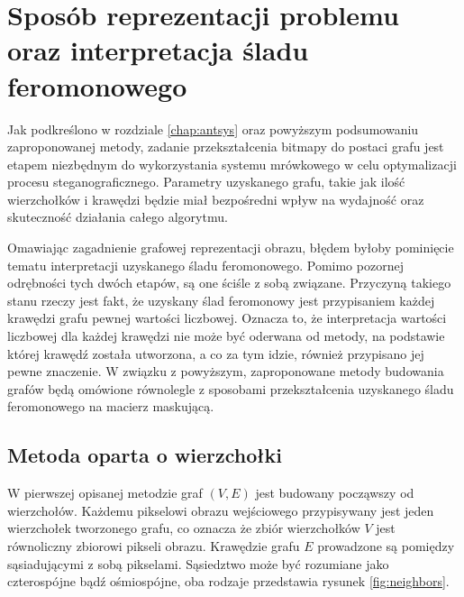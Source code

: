 {    \section{Sposób reprezentacji problemu oraz interpretacja śladu feromonowego}\label{sec:method}
    {
        Jak podkreślono w rozdziale \ref{chap:antsys} oraz powyższym podsumowaniu zaproponowanej metody, zadanie
        przekształcenia bitmapy do postaci grafu jest etapem niezbędnym do wykorzystania systemu mrówkowego w celu
        optymalizacji procesu steganograficznego. Parametry uzyskanego grafu, takie jak ilość wierzchołków i krawędzi
        będzie miał bezpośredni wpływ na wydajność oraz skuteczność działania całego algorytmu.

        Omawiając zagadnienie grafowej reprezentacji obrazu, błędem byłoby pominięcie tematu interpretacji uzyskanego
        śladu feromonowego. Pomimo pozornej odrębności tych dwóch etapów, są one ściśle z sobą związane. Przyczyną
        takiego stanu rzeczy jest fakt, że uzyskany ślad feromonowy jest przypisaniem każdej krawędzi grafu pewnej
        wartości liczbowej. Oznacza to, że interpretacja wartości liczbowej dla każdej krawędzi nie może być oderwana od
        metody, na podstawie której krawędź została utworzona, a co za tym idzie, również przypisano jej pewne
        znaczenie. W związku z powyższym, zaproponowane metody budowania grafów będą omówione równolegle z sposobami
        przekształcenia uzyskanego śladu feromonowego na macierz maskującą.

        \subsection{Metoda oparta o wierzchołki}\label{subsec:vertex-method}
        {
            W pierwszej opisanej metodzie graf $(V, E)$ jest budowany począwszy od wierzchołów. Każdemu pikselowi obrazu
            wejściowego przypisywany jest jeden wierzchołek tworzonego grafu, co oznacza że zbiór wierzchołków $V$ jest
            równoliczny zbiorowi pikseli obrazu. Krawędzie grafu $E$ prowadzone są pomiędzy sąsiadującymi z sobą
            pikselami. Sąsiedztwo może być rozumiane jako czterospójne bądź ośmiospójne, oba rodzaje przedstawia rysunek
            \ref{fig:neighbors}.

            \begin{figure}
                \footnotesize
                \centering
                \hspace{8pt}


\end{figure}}}}
